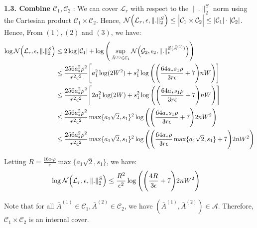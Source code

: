\noindent\newline\textbf{1.3. Combine $\mathcal{C}_1, \mathcal{C}_2$} : We can cover $\mathcal{L}_r$ with respect to the $\|.\|_2^S$ norm using the Cartesian product $\mathcal{C}_1\times\mathcal{C}_2$. Hence, $\mathcal{N}\Big( \mathcal{L}_r, \epsilon, \|.\|_2^S \Big) \le \Big| \mathcal{C}_1 \times \mathcal{C}_2 \Big| \le |\mathcal{C}_1|\cdot|\mathcal{C}_2|$. Hence, From $(1), (2)$ and $(3)$, we have:
\begin{align*}
    \log\mathcal{N}\Big( \mathcal{L}_r, \epsilon, \|.\|_2^S \Big) &\le 2\log|\mathcal{C}_1| + \log\Bigg( 
        \sup_{\bar A^{(1)} \in \mathcal{C}_1} \mathcal{N}\Big( \mathcal{G}_2, \epsilon_2, \|.\|_*^{Z(\bar A^{(1)})} \Big)
     \Bigg) \\
    &\le \frac{256a_*^2\rho^2}{r^2\epsilon^2}\Bigg[ 
        a_1^2\log(2W^2) + s_1^2\log\Bigg( \Bigg( 
            \frac{64a_*s_1\rho}{3r\epsilon} + 7
         \Bigg)nW \Bigg)
     \Bigg] \\
    &\le \frac{256a_*^2\rho^2}{r^2\epsilon^2}\Bigg[ 
        2a_1^2\log(2W) + s_1^2\log\Bigg( \Bigg( 
            \frac{64a_*s_1\rho}{3r\epsilon} + 7
         \Bigg)nW \Bigg)
     \Bigg] \\
    &\le \frac{256a_*^2\rho^2}{r^2\epsilon^2}\max\{a_1\sqrt{2}, s_1\}^2 \log\Bigg( 
        \Bigg( 
            \frac{64a_*s_1\rho}{3r\epsilon} + 7
         \Bigg)2nW^2
     \Bigg) \\ 
    &\le \frac{256a_*^2\rho^2}{r^2\epsilon^2}\max\{a_1\sqrt{2}, s_1\}^2 \log\Bigg( 
        \Bigg( 
            \frac{64a_*\rho}{3r\epsilon}\max\{a_1\sqrt{2}, s_1\} + 7
         \Bigg)2nW^2
     \Bigg) \\ 
\end{align*}

\noindent Letting $R = \frac{16a_*\rho}{r}\max\{a_1\sqrt{2}, s_1\}$, we have:
\begin{align*}
    \log\mathcal{N}\Big( \mathcal{L}_r, \epsilon, \|.\|_2^S \Big) 
        &\le \frac{R^2}{\epsilon^2}\log\Bigg( 
            \Bigg( \frac{4R}{3\epsilon} + 7
         \Bigg)2nW^2 \Bigg)
\end{align*}

\noindent Note that for all $\bar A^{(1)} \in \mathcal{C}_1, \bar A^{(2)} \in \mathcal{C}_2$, we have $(\bar A^{(1)}, \bar A^{(2)}) \in \mathcal{A}$. Therefore, $\mathcal{C}_1\times\mathcal{C}_2$ is an internal cover.

